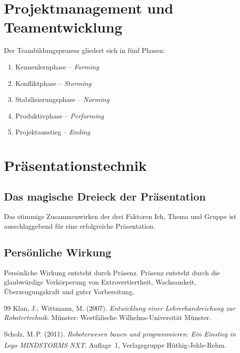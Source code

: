 \documentclass{wbh-studienheft}
\begin{document}
\section{Projektmanagement und Teamentwicklung}

Der Teambildungsprozess gliedert sich in fünf Phasen:

\begin{enumerate}[nosep]
  \item Kennenlernphase – \textit{Forming}
  \item Konfliktphase – \textit{Storming}
  \item Stabilisierungsphase – \textit{Norming}
  \item Produktivphase – \textit{Performing}
  \item Projektausstieg – \textit{Ending}
\end{enumerate}

\section{Präsentationstechnik}

\subsection{Das magische Dreieck der Präsentation}

Das stimmige Zusammenwirken der drei Faktoren Ich, Thema und Gruppe
ist ausschlaggebend für eine erfolgreiche Präsentation.

\subsection{Persönliche Wirkung}

Persönliche Wirkung entsteht durch Präsenz. Präsenz entsteht durch die
glaubwürdige Verkörperung von Extrovertiertheit, Wachsamkeit,
Überzeugungskraft und guter Vorbereitung.

\appendix
\listoffigures
\listoftables

\begin{thebibliography}{99}
    Klan, J.; Wittmann, M. (2007).
    \textit{Entwicklung einer Lehrerhandreichung zur Robotertechnik}.
    Münster: Westfälische Wilhelms-Universität Münster.

    Scholz, M.\,P. (2011).
    \textit{Roboterwesen bauen und programmieren: Ein Einstieg in
    Lego\textsuperscript{\textregistered} MINDSTORMS\textsuperscript{\textregistered} NXT}.
    Auflage~1, Verlagsgruppe Hüthig-Jehle-Rehm.
\end{thebibliography}
\end{document}
